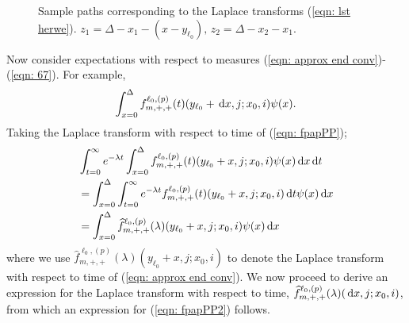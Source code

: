 \begin{figure}
    \caption{\label{fig: sample paths lst} Sample paths corresponding to the Laplace transforms (\ref{eqn: lst herwe}). \(z_1 = \Delta - x_1-(x-y_{\ell_0}),\, z_2= \Delta - x_2-x_1\).}
\end{figure}

Now consider expectations with respect to measures (\ref{eqn: approx end conv})-(\ref{eqn: 67}). For example,
\begin{align}
	\int_{x=0}^\Delta f^{\ell_0,(p)}_{m,+,+}(t)( y_{\ell_0} + \, \mathrm{d} x,j; x_0,i) \psi(x). \label{eqn: fpapPP}
\end{align}
Taking the Laplace transform with respect to time of (\ref{eqn: fpapPP});
\begin{align}
	&\int_{t=0}^\infty e^{-\lambda t}\int_{x=0}^\Delta f^{\ell_0,(p)}_{m,+,+}(t)( y_{\ell_0} + x, j; x_0,i) \psi(x)\, \mathrm{d} x \, \mathrm{d} t \nonumber 
	\\&= \int_{x=0}^\Delta \int_{t=0}^\infty e^{-\lambda t} f^{\ell_0,(p)}_{m,+,+}(t)( y_{\ell_0} + x, j; x_0,i)  \, \mathrm{d} t \psi(x) \, \mathrm{d} x \nonumber 
	\\&= \int_{x=0}^\Delta \widehat f^{\ell_0,(p)}_{m,+,+}(\lambda)( y_{\ell_0} + x, j; x_0,i) \psi(x) \, \mathrm{d} x \label{eqn: fpapPP2}
\end{align}
where we use \(\widehat f^{\ell_0,(p)}_{m,+,+}(\lambda)( y_{\ell_0} + x, j; x_0,i) \) to denote the Laplace transform with respect to time of (\ref{eqn: approx end conv}). We now proceed to derive an expression for the Laplace transform with respect to time, \(\widehat f^{\ell_0,(p)}_{m,+,+}(\lambda)( \, \mathrm{d} x, j; x_0,i) \), from which an expression for (\ref{eqn: fpapPP2}) follows. 

